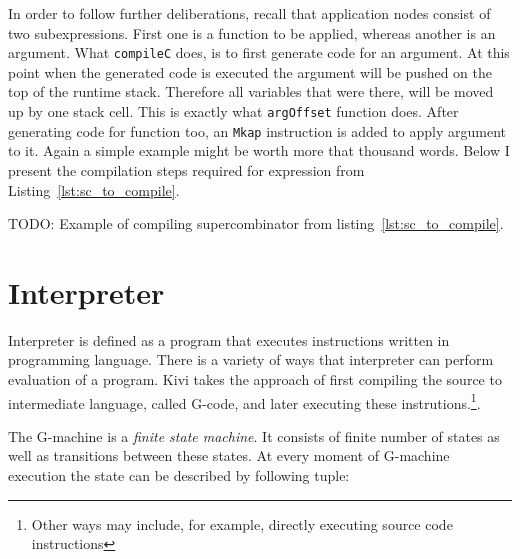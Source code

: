 \documentclass[12pt,a4paper]{report}
\begin{document}
In order to follow further deliberations, recall that application nodes consist
of two subexpressions. First one is a function to be applied, whereas another
is an argument. What \texttt{compileC} does, is to first generate code for an
argument. At this point when the generated code is executed the argument will
be pushed on the top of the runtime stack. Therefore all variables that were
there, will be moved up by one stack cell. This is exactly what
\texttt{argOffset} function does. After generating code for function too, an
\texttt{Mkap} instruction is added to apply argument to it. Again a simple
example might be worth more that thousand words. Below I present the
compilation steps required for expression from Listing~\ref{lst:sc_to_compile}.


TODO: Example of compiling supercombinator from listing~\ref{lst:sc_to_compile}.


\section{Interpreter}
\label{sec:interpreter}
Interpreter is defined as a program that executes instructions written in
programming language. There is a variety of ways that interpreter can perform
evaluation of a program. Kivi takes the approach of first compiling the source
to intermediate language, called G-code, and later executing these
instrutions.\footnote{Other ways may include, for example, directly executing
source code instructions}.

The G-machine is a \textit{finite state machine}. It consists of finite number
of states as well as transitions between these states. At every moment of
G-machine execution the state can be described by following tuple:
\end{document}
